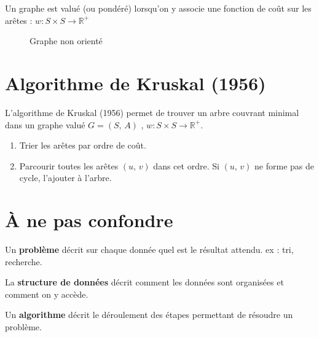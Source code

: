 \begin{definition}
Un graphe est valué (ou pondéré) lorsqu'on y associe une fonction de coût sur les arêtes : $w : S \times S \rightarrow \mathbb{R}^{+}$
\end{definition}

\begin{figure}[h]
	\centering
	\caption{Graphe non orienté}
	\label{fig:graph1value}
\end{figure}

\section{Algorithme de Kruskal (1956)}

L'algorithme de Kruskal (1956) permet de trouver un arbre couvrant minimal dans un graphe valué $G = (S,\, A)$ , $w : S \times S \rightarrow \mathbb{R}^{+}$.

\begin{enumerate}
	\item Trier les arêtes par ordre de coût.
	\item Parcourir toutes les arêtes $(u,\, v)$ dans cet ordre. Si $(u,\, v)$ ne forme pas de cycle, l'ajouter à l'arbre.
\end{enumerate}


\section*{À ne pas confondre}

Un \textbf{problème} décrit sur chaque donnée quel est le résultat attendu. ex : tri, recherche.

La \textbf{structure de données} décrit comment les données sont organisées et comment on y accède.

Un \textbf{algorithme} décrit le déroulement des étapes permettant de résoudre un problème.

